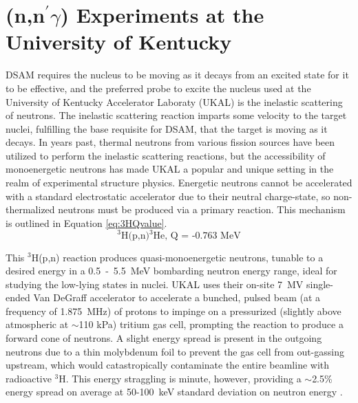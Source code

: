 \section{(n,n$^{\prime}\gamma$) Experiments at the University of Kentucky}
DSAM requires the nucleus to be moving as it decays from an excited state for it to be effective, and the preferred probe to excite the nucleus used at the University of Kentucky Accelerator Laboraty (UKAL) is the inelastic scattering of neutrons. The inelastic scattering reaction imparts some velocity to the target nuclei, fulfilling the base requisite for DSAM, that the target is moving as it decays. In years past, thermal neutrons from various fission sources have been utilized to perform the inelastic scattering reactions, but the accessibility of monoenergetic neutrons has made UKAL a popular and unique setting in the realm of experimental structure physics. Energetic neutrons cannot be accelerated with a standard electrostatic accelerator due to their neutral charge-state, so non-thermalized neutrons must be produced via a primary reaction. This mechanism is outlined in Equation \ref{eq:3HQvalue}.
\begin{equation} \label{eq:3HQvalue}
\text{${}^3$H(p,n)${}^3$He, Q = -0.763 MeV}
\end{equation}

This $^3$H(p,n) reaction produces quasi-monoenergetic neutrons, tunable to a desired energy in a 0.5~-~5.5~MeV bombarding neutron energy range, ideal for studying the low-lying states in nuclei. UKAL uses their on-site 7~MV single-ended Van DeGraff accelerator to accelerate a bunched, pulsed beam (at a frequency of 1.875~MHz) of protons to impinge on a pressurized (slightly above atmospheric at $\sim$110 kPa) tritium gas cell, prompting the reaction to produce a forward cone of neutrons. A slight energy spread is present in the outgoing neutrons due to a thin molybdenum foil to prevent the gas cell from out-gassing upstream, which would catastropically contaminate the entire beamline with radioactive $^3$H. This energy straggling is minute, however, providing a $\sim$2.5\% energy spread on average at 50-100~keV standard deviation on neutron energy \cite{Belgya_DSAM1996}. %

